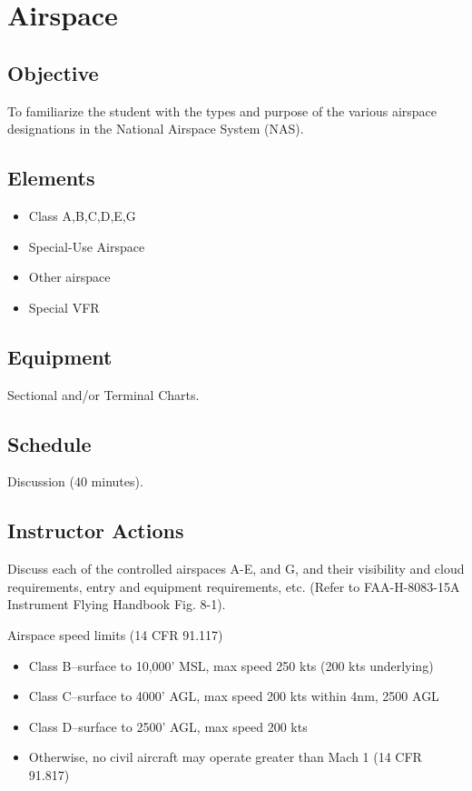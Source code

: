 \section{Airspace}

\subsection{Objective}

To familiarize the student with the types and purpose of the various airspace
designations in the National Airspace System (NAS).

\subsection{Elements}

\begin{itemize}
  \item Class A,B,C,D,E,G
  \item Special-Use Airspace
  \item Other airspace
  \item Special VFR
\end{itemize}

\subsection{Equipment}

Sectional and/or Terminal Charts.

\subsection{Schedule}

Discussion (40 minutes).

\subsection{Instructor Actions}

Discuss each of the controlled airspaces A-E, and G, and their visibility and
cloud requirements, entry and equipment requirements, etc. (Refer to
FAA-H-8083-15A Instrument Flying Handbook Fig. 8-1).

Airspace speed limits (14 CFR 91.117)
\begin{itemize}
  \item Class B--surface to 10,000' MSL, max speed 250 kts (200 kts underlying)
  \item Class C--surface to 4000' AGL, max speed 200 kts within 4nm, 2500 AGL
  \item Class D--surface to 2500' AGL, max speed 200 kts
  \item Otherwise, no civil aircraft may operate greater than Mach 1 (14 CFR
    91.817)
\end{itemize}

